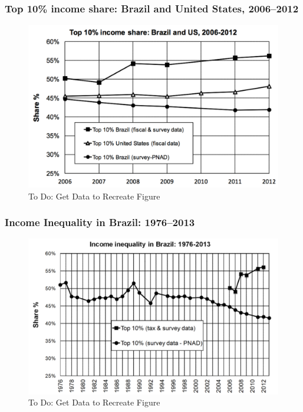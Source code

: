 \begin{frame}[label=BrazilUSTop10]
\frametitle{Top 10\% income share: Brazil and United States, 2006--2012}
\begin{figure}[t]
\begin{minipage}[b]{\textwidth}
\centering
\includegraphics[width=\textwidth]
{pictures/Top10BrazilVsUSA}
\caption{To Do: Get Data to Recreate Figure}
\end{minipage}
\end{figure}
\end{frame}


\begin{frame}[label=BrazilInequality]
\frametitle{Income Inequality in Brazil: 1976--2013}
\begin{figure}[t]
\begin{minipage}[b]{\textwidth}
\centering
\includegraphics[width=\textwidth]
{pictures/IncomeInequalityBrazil}
\caption{To Do: Get Data to Recreate Figure}
\end{minipage}
\end{figure}
\end{frame}


